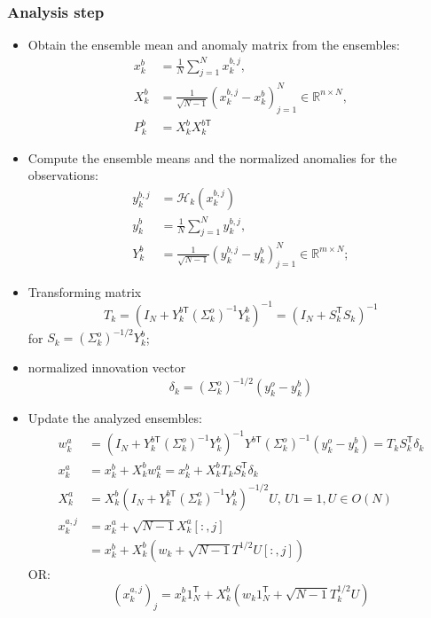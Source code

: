 \documentclass{article}
\newcommand{\trans}{\mathsf{T}}
\begin{document}
\subsubsection{Analysis step}
\begin{itemize}
	\item Obtain the ensemble mean and anomaly matrix from the ensembles:
	      \begin{align*}
		      x_k^b & = \frac1N\sum_{j=1}^Nx_k^{b,j},                                           \\
		      X_k^b & = \frac1{\sqrt{N-1}}(x_k^{b,j} - x_k^b)_{j=1}^N\in\mathbb{R}^{n\times N}, \\
		      P_k^b & = X_k^bX_k^{b\trans}
	      \end{align*}
	\item Compute the ensemble means and the normalized anomalies for the observations:
	      \begin{align*}
		      y_k^{b,j} & = \mathcal{H}_k(x_k^{b,j})                                                \\
		      y_k^b     & = \frac1N\sum_{j=1}^Ny_k^{b,j},                                           \\
		      Y_k^b     & = \frac1{\sqrt{N-1}}(y_k^{b,j} - y_k^b)_{j=1}^N\in\mathbb{R}^{m\times N};
	      \end{align*}
	\item Transforming matrix
	      $$
		      T_k = (I_N+Y_k^{b\trans}(\Sigma_k^o)^{-1}Y_k^b)^{-1} = (I_N + S_k^\trans S_k)^{-1}
	      $$
	      for $S_k=(\Sigma_k^o)^{-1/2}Y_k^b$;

	\item normalized innovation vector
	      $$
		      \delta_k = (\Sigma_k^o)^{-1/2}(y_k^o-y_k^b)
	      $$
	\item Update the analyzed ensembles:
	      \begin{align*}
		      w_k^a     & = (I_N + Y_k^{b\trans}(\Sigma_k^o)^{-1} Y_k^b)^{-1}Y^{b\trans}(\Sigma_k^o)^{-1}(y_k^o-y_k^b)=T_kS_k^\trans \delta_k \\
		      x_k^a     & = x_k^b + X_k^bw_k^a = x_k^b + X_k^bT_kS_k^\trans \delta_k                                                          \\
		      X_k^a     & = X_k^b(I_N+Y_k^{b\trans}(\Sigma_k^o)^{-1}Y_k^b)^{-1/2}U,\, U1=1, U\in O(N)                                         \\
		      x_k^{a,j} & = x_k^a + \sqrt{N-1}X_k^a[:, j]                                                                                     \\
		                & = x_k^b + X_k^b(w_k + \sqrt{N-1}T^{1/2}U[:, j])
	      \end{align*}
	      OR:
	      $$
		      (x_k^{a,j})_j = x_k^b1_N^\trans  + X_k^b(w_k1_N^\trans +\sqrt{N-1}T_k^{1/2}U)
	      $$
\end{itemize}
\end{document}
